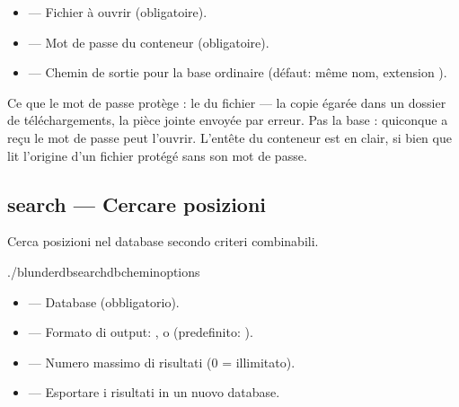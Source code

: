 \documentclass[letterpaper,10pt,italian]{sphinxmanual}
\begin{document}
\sphinxAtStartPar
{}
\begin{itemize}
\item {} 
\sphinxAtStartPar
{} — Fichier  à ouvrir (obligatoire).

\item {} 
\sphinxAtStartPar
{} — Mot de passe du conteneur (obligatoire).

\item {} 
\sphinxAtStartPar
{} — Chemin de sortie pour la base ordinaire (défaut: même nom,
extension ).

\end{itemize}

\sphinxAtStartPar
Ce que le mot de passe protège : le  du fichier — la copie égarée
dans un dossier de téléchargements, la pièce jointe envoyée par erreur. Pas la
base : quiconque a reçu le mot de passe peut l’ouvrir. L’en\sphinxhyphen{}tête du conteneur
est en clair, si bien que  lit l’origine d’un fichier
protégé sans son mot de passe.


\subsection{search — Cercare posizioni}
\label{\detokenize{cli:search-rechercher-des-positions}}
\sphinxAtStartPar
Cerca posizioni nel database secondo criteri combinabili.

\begin{sphinxVerbatim}[commandchars=\\\{\}]
./blunderdbsearch\PYGZhy{}\PYGZhy{}db\PYGZlt{}chemin\PYGZgt{}\PYG{o}{[}options\PYG{o}{]}
\end{sphinxVerbatim}

\sphinxAtStartPar
{}
\begin{itemize}
\item {} 
\sphinxAtStartPar
{} — Database (obbligatorio).

\item {} 
\sphinxAtStartPar
{} — Formato di output: ,  o  (predefinito: ).

\item {} 
\sphinxAtStartPar
{} — Numero massimo di risultati (0 = illimitato).

\item {} 
\sphinxAtStartPar
{} — Esportare i risultati in un nuovo database.

\end{itemize}
\end{document}
